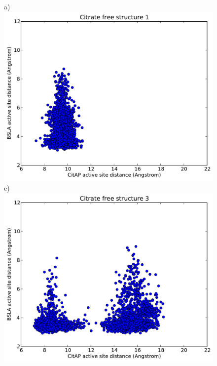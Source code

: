 \documentclass[english, a4paper, 12pt, titlepage, draft]{article}
\begin{document}
\begin{figure}
    \begin{minipage}[]{0.45\linewidth}
        \centering
        a)
        \includegraphics[width=\textwidth]{figures/CitAP_BSLA_distance/BSLA_CitAP_distance_free_structure1.pdf}  
        c)
        \includegraphics[width=\textwidth]{figures/CitAP_BSLA_distance/BSLA_CitAP_distance_free_structure3.pdf}  
    \end{minipage}
\hspace{0.5cm}
    \begin{minipage}[]{0.45\linewidth}

\end{minipage}
\end{figure}
\end{document}
